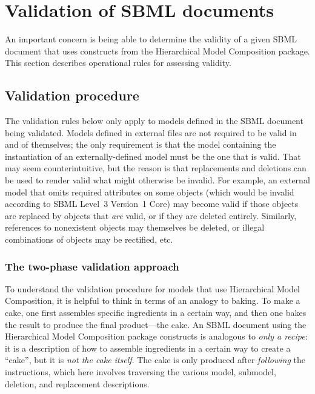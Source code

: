 
\section{Validation of SBML documents}
\label{apdx-validation}

An important concern is being able to determine the validity of a given SBML document that uses constructs from the Hierarchical Model Composition package. This section describes operational rules for assessing validity.


\subsection{Validation procedure}
\label{validation-procedure}

The validation rules below only apply to models defined in the SBML document being validated. Models defined in external files are not required to be valid in and of themselves; the only requirement is that the model containing the instantiation of an externally-defined model must be the one that is valid. That may seem counterintuitive, but the reason is that replacements and deletions can be used to render valid what might otherwise be invalid. For example, an external model that omits required attributes on some objects (which would be invalid according to SBML Level~3 Version~1 Core) may become valid if those objects are replaced by objects that \emph{are} valid, or if they are deleted entirely. Similarly, references to nonexistent objects may themselves be deleted, or illegal combinations of objects may be rectified, etc.


\subsubsection{The two-phase validation approach}

To understand the validation procedure for models that use Hierarchical Model Composition, it is helpful to think in terms of an analogy to baking. To make a cake, one first assembles specific ingredients in a certain way, and then one bakes the result to produce the final product---the cake. An SBML document using the Hierarchical Model Composition package constructs is analogous to \emph{only a recipe}: it is a description of how to assemble ingredients in a certain way to create a ``cake'', but it is \emph{not the cake itself}. The cake is only produced after \emph{following} the instructions, which here involves traversing the various model, submodel, deletion, and replacement descriptions.


